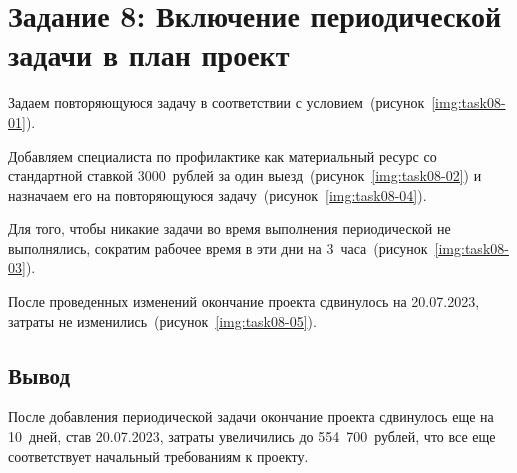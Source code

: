 \section{Задание 8: Включение периодической задачи в план проект}

Задаем повторяющуюся задачу в соответствии с условием~(рисунок~\ref{img:task08-01}).


Добавляем специалиста по профилактике как материальный ресурс со стандартной
ставкой 3000~рублей за один выезд~(рисунок~\ref{img:task08-02}) и назначаем его
на повторяющуюся задачу~(рисунок~\ref{img:task08-04}).



Для того, чтобы никакие задачи во время выполнения периодической не
выполнялись, сократим рабочее время в эти дни на
3~часа~(рисунок~\ref{img:task08-03}).


После проведенных изменений окончание проекта сдвинулось на 20.07.2023, затраты
не изменились~(рисунок~\ref{img:task08-05}).


\subsection*{Вывод}

После добавления периодической задачи окончание проекта сдвинулось еще на
10~дней, став 20.07.2023, затраты увеличились до 554~700~рублей, что все еще
соответствует начальный требованиям к проекту.
